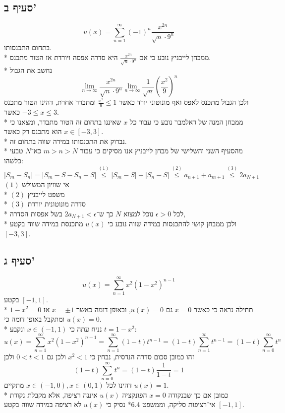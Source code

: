 \subsection{סעיף ב'}
\[
	u(x) = \sum_{n = 1}^{\infty} {(-1)}^n \frac{x^{2n}}{\sqrt{n} \cdot 9^n}
\]
בתחום התכנסותו. \\*
ממבחן לייבניץ נובע כי אם $\frac{x^{2n}}{\sqrt{n} \cdot 9^n}$ היא סדרה אפסה ויורדת אז הטור מתכנס. \\*
נחשב את הגבול
\[
	\lim_{n \to \infty} \frac{x^{2n}}{\sqrt{n} \cdot 9^n}
	\lim_{n \to \infty} \frac{1}{\sqrt{n}} {\left(\frac{x^2}{9}\right)}^n
\]
ולכן הגבול מתכנס לאפס ואף מונוטוני יורד כאשר $\frac{x^2}{9} \le 1$ ומתבדר אחרת, דהינו הטור מתכנס כאשר $-3 \le x \le 3$. \\*
ממבחן המנה של דאלמבר נובע כי עבור כל $x$ שאיננו בתחום זה הטור מתבדר, ומצאנו כי הוא מתכנס רק כאשר $x \in [-3, 3]$. \\*
נבדוק את התכנסותו במידה שווה בתחום זה. \\*
מהסעיף השני והשלישי של מבחן לייבניץ אנו מסיקים כי עבור $m > n > N$ כא־$N$ טבעי כלשהו:
\[
	\lvert S_m - S_n \rvert
	= \lvert S_m - S - S_n + S \rvert
	\overset{(1)}{\le} \lvert S_m - S \rvert + \lvert S_n - S \rvert
	\overset{(2)}{\le} a_{n + 1} + a_{m + 1}
	\overset{(3)}{\le} 2a_{N + 1}
\]
$(1)$ אי שוויון המשולש \\*
$(2)$ משפט לייבניץ \\*
$(3)$ סדרה מונוטונית יורדת \\*
לכל $\epsilon > 0$ נוכל למצוא $N$ כך ש־$2a_{N + 1} < \epsilon$ בשל אפסות הסדרה, \\*
ולכן ממבחן קושי להתכנסות במידה שווה נובע כי $u(x)$ מתכנסת במידה שווה בקטע $[-3, 3]$.

\subsection{סעיף ג'}
\[
	u(x) = \sum_{n = 1}^{\infty} x^2 {(1 - x^2)}^{n - 1}
\]
בקטע $[-1, 1]$. \\*
תחילה נראה כי כאשר $x = 0$ גם $u(x) = 0$, ובאופן דומה כאשר $x = \pm 1$ אז $1 - x^2 = 0$ ומתקבל באופן דומה כי $u(x) = 0$. \\*
נניח עתה כי $x \in (-1, 1)$ ונקבע $t = 1 - x^2$:
\[
	u(x)
	= \sum_{n = 1}^{\infty} x^2 {(1 - x^2)}^{n - 1}
	= \sum_{n = 1}^{\infty} (1 - t) t^{n - 1}
	= (1 - t) \sum_{n = 1}^{\infty} t^{n - 1}
	= (1 - t) \sum_{n = 0}^{\infty} t^n
\]
זהו כמובן סכום סדרה הנדסית, נבחין כי $x^2 < 1$ ולכן גם $0 < t < 1$ ולכן
\[
	(1 - t) \sum_{n = 0}^{\infty} t^n
	= (1 - t) \frac{1}{1 - t}
	= 1
\]
דהינו לכל $x \in (-1, 0), x \in (0, 1)$ מתקיים $u(x) = 1$. \\*
כמובן אם כך שבנקודה $x = 0$ הפונקציה $u(x)$ איננה רציפה, אלא מקבלת נקודת אי־רציפות סליקה,
וממשפט 6.4* נסיק כי $u(x)$ לא רציפה במידה שווה בקטע $[-1, 1]$.


